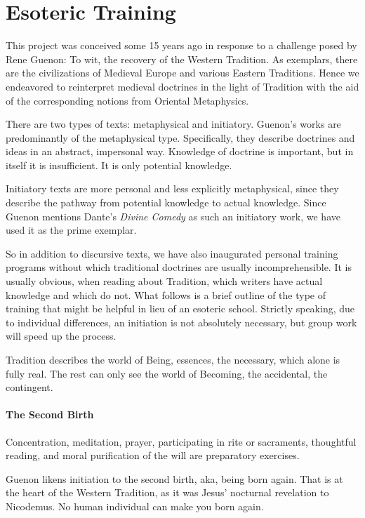 \section{Esoteric Training}

This project was conceived some 15 years ago in response to a challenge posed by Rene Guenon: To wit, the recovery of the Western Tradition. As exemplars, there are the civilizations of Medieval Europe and various Eastern Traditions. Hence we endeavored to reinterpret medieval doctrines in the light of Tradition with the aid of the corresponding notions from Oriental Metaphysics.

There are two types of texts: metaphysical and initiatory. Guenon's works are predominantly of the metaphysical type. Specifically, they describe doctrines and ideas in an abstract, impersonal way. Knowledge of doctrine is important, but in itself it is insufficient. It is only potential knowledge.

Initiatory texts are more personal and less explicitly metaphysical, since they describe the pathway from potential knowledge to actual knowledge. Since Guenon mentions Dante's \emph{Divine Comedy} as such an initiatory work, we have used it as the prime exemplar.

So in addition to discursive texts, we have also inaugurated personal training programs without which traditional doctrines are usually incomprehensible. It is usually obvious, when reading about Tradition, which writers have actual knowledge and which do not. What follows is a brief outline of the type of training that might be helpful in lieu of an esoteric school. Strictly speaking, due to individual differences, an initiation is not absolutely necessary, but group work will speed up the process.

Tradition describes the world of Being, essences, the necessary, which alone is fully real. The rest can only see the world of Becoming, the accidental, the contingent.

\paragraph{The Second Birth}
Concentration, meditation, prayer, participating in rite or sacraments, thoughtful reading, and moral purification of the will are preparatory exercises.

Guenon likens initiation to the second birth, aka, being born again. That is at the heart of the Western Tradition, as it was Jesus' nocturnal revelation to Nicodemus. No human individual can make you born again.


